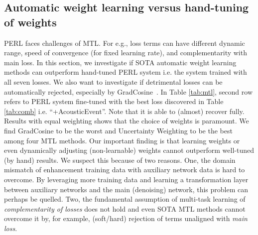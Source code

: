 \documentclass{article}
\begin{document}
\subsection{Automatic weight learning versus hand-tuning of weights}
\label{sec:multi}
PERL faces challenges of MTL. For e.g., loss terms can have different dynamic range, speed of convergence (for fixed learning rate), and complementarity with main loss.
In this section, we investigate if \ac{SOTA} automatic weight learning methods can outperform hand-tuned PERL system i.e. the system trained with all seven losses.
We also want to investigate if detrimental losses can be automatically rejected, especially by GradCosine~\cite{du2018adapting}.
In Table \ref{tab:mtl}, second row refers to PERL system fine-tuned with the best loss discovered in Table \ref{tab:comb} i.e. ``+AcousticEvent''.
Note that it is able to (almost) recover fully.
Results with equal weighting shows that the choice of weights is paramount.
We find GradCosine to be the worst and Uncertainty Weighting to be the best among four \ac{MTL} methods.
Our important finding is that learning weights or even dynamically adjusting (non-learnable) weights cannot outperform well-tuned (by hand) results.
We suspect this because of two reasons.
One, the domain mismatch of enhancement training data with auxiliary network data is hard to overcome.
By leveraging more training data and learning a transformation layer between auxiliary networks and the main (denoising) network, this problem can perhaps be quelled.
Two, the fundamental assumption of multi-task learning of \emph{complementarity of losses} does not hold and even SOTA MTL methods cannot overcome it by, for example, (soft/hard) rejection of terms unaligned with \emph{main loss}.



\vspace{2mm}
\end{document}

